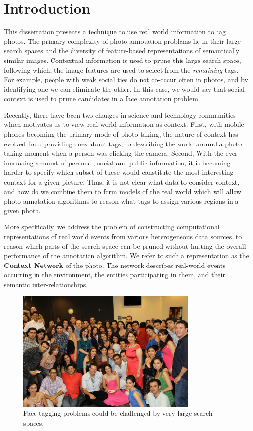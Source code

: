 \chapter{Introduction}

This dissertation presents a technique to use real world information to tag photos. The primary complexity of photo annotation problems lie in their large search spaces and the diversity of feature-based representations of semantically similar images. Contextual information is used to prune this large search space, following which, the image features are used to select from the \textit{remaining} tags. For example, people with weak social ties do not co-occur often in photos, and by identifying one we can eliminate the other. In this case, we would say that social context is used to prune candidates in a face annotation problem.

Recently, there have been two changes in science and technology communities which motivates us to view real world information as context. First, with mobile phones becoming the primary mode of photo taking, the nature of context has evolved from providing cues about tags, to describing the world around a photo taking moment when a person was clicking the camera. Second, With the ever increasing amount of personal, social and public information, it is becoming harder to specify which subset of these would constitute the most interesting context for a given picture. Thus, it is not clear what data to consider context, and how do we combine them to form models of the real world which will allow photo annotation algorithms to reason what tags to assign various regions in a given photo.

More specifically, we address the problem of constructing computational representations of real world events from various heterogeneous data sources, to reason which parts of the search space can be pruned without hurting the overall performance of the annotation algorithm. We refer to such a representation as the \textbf{Context Network} of the photo. The network describes real-world events occurring in the environment, the entities participating in them, and their semantic inter-relationships.

\begin{figure}[t]
\centering
\includegraphics[width=0.8\textwidth]{media/chapter1/setarehetal}
\caption{Face tagging problems could be challenged by very large search spaces.}
\label{fig:people}
\end{figure}

